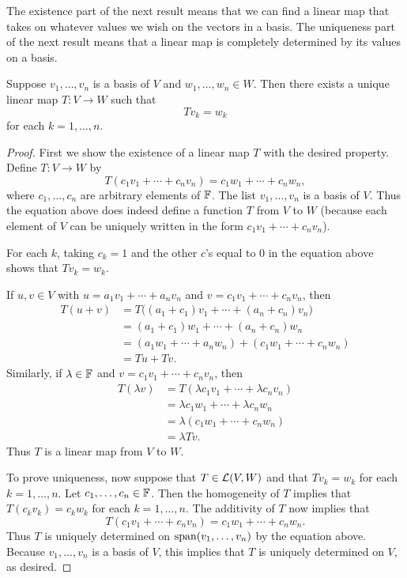 The existence part of the next result means that we can find a linear map that
takes on whatever values we wish on the vectors in a basis. The uniqueness part
of the next result means that a linear map is completely determined by its
values on a basis.

\begin{result}\label{ax:3.4}
Suppose $v_1,\dots,v_n$ is a basis of $V$ and $w_1,\dots,w_n\in W$. Then there
exists a unique linear map $T\colon V\to W$ such that
\[ Tv_k=w_k \]
for each $k=1,\dots,n$.
\end{result}

\begin{proof}
First we show the existence of a linear map $T$ with the desired property.
Define $T\colon V\to W$ by
\[ T(c_1v_1+\cdots+c_nv_n)=c_1w_1+\cdots+c_nw_n, \]
where $c_1,\dots,c_n$ are arbitrary elements of $\mathbb{F}$. The list
$v_1,\dots,v_n$ is a basis of $V$. Thus the equation above does indeed define a
function $T$ from $V$ to $W$ (because each element of $V$ can be uniquely
written in the form $c_1v_1+\cdots+c_nv_n$).

For each $k$, taking $c_k=1$ and the other $c$'s equal to $0$ in the equation
above shows that $Tv_k=w_k$.

If $u,v\in V$ with $u=a_1v_1+\cdots+a_nv_n$ and $v=c_1v_1+\cdots+c_nv_n$, then
\begin{align*}
T(u+v) &= T\bigl((a_1+c_1)v_1+\cdots+(a_n+c_n)v_n\bigr)\\
       &= (a_1+c_1)w_1+\cdots+(a_n+c_n)w_n\\
       &= (a_1w_1+\cdots+a_nw_n)+(c_1w_1+\cdots+c_nw_n)\\
       &= Tu+Tv.
\end{align*}
Similarly, if $\lambda\in\mathbb{F}$ and $v=c_1v_1+\cdots+c_nv_n$, then
\begin{align*}
T(\lambda v) &= T(\lambda c_1v_1+\cdots+\lambda c_nv_n)\\
             &= \lambda c_1w_1+\cdots+\lambda c_nw_n\\
             &= \lambda(c_1w_1+\cdots+c_nw_n)\\
             &= \lambda Tv.
\end{align*}
Thus $T$ is a linear map from $V$ to $W$.

To prove uniqueness, now suppose that $T\in\mathcal{L}(V,W)$ and that $Tv_k=w_k$ for
each $k=1,\dots,n$. Let $c_1,\dots,c_n\in\mathbb{F}$. Then the homogeneity of $T$
implies that $T(c_kv_k)=c_kw_k$ for each $k=1,\dots,n$. The additivity of $T$
now implies that
\[ T(c_1v_1+\cdots+c_nv_n)=c_1w_1+\cdots+c_nw_n. \]
Thus $T$ is uniquely determined on $\operatorname{span}(v_1,\dots,v_n)$ by the equation above.
Because $v_1,\dots,v_n$ is a basis of $V$, this implies that $T$ is uniquely
determined on $V$, as desired.
\end{proof}

